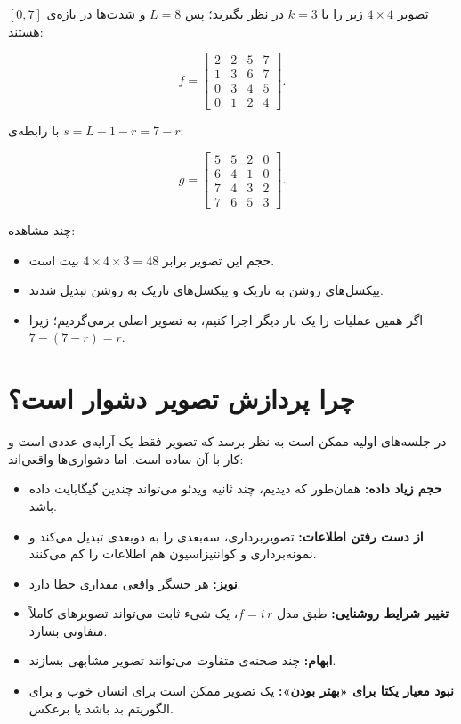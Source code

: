 \documentclass[11pt,a4paper]{article}
\begin{document}
	تصویر $4\times4$ زیر را با $k=3$ در نظر بگیرید؛ پس $L=8$ و شدت‌ها در بازه‌ی $[0,7]$ هستند:
	
	\[
	f=
	\begin{bmatrix}
		2 & 2 & 5 & 7\\
		1 & 3 & 6 & 7\\
		0 & 3 & 4 & 5\\
		0 & 1 & 2 & 4
	\end{bmatrix}.
	\]
	
	با رابطه‌ی $s=L-1-r=7-r$:
	
	\[
	g=
	\begin{bmatrix}
		5 & 5 & 2 & 0\\
		6 & 4 & 1 & 0\\
		7 & 4 & 3 & 2\\
		7 & 6 & 5 & 3
	\end{bmatrix}.
	\]
	
	چند مشاهده:
	
	\begin{itemize}
		\item حجم این تصویر برابر $4\times4\times3=48$ بیت است.
		\item پیکسل‌های روشن به تاریک و پیکسل‌های تاریک به روشن تبدیل شدند.
		\item اگر همین عملیات را یک بار دیگر اجرا کنیم، به تصویر اصلی برمی‌گردیم؛ زیرا
		$7-(7-r)=r$.
	\end{itemize}
	
	
	\section{چرا پردازش تصویر دشوار است؟}
	
	در جلسه‌های اولیه ممکن است به نظر برسد که تصویر فقط یک آرایه‌ی عددی است و کار با آن ساده است.
	اما دشواری‌ها واقعی‌اند:
	
	\begin{itemize}
		\item \textbf{حجم زیاد داده:} همان‌طور که دیدیم، چند ثانیه ویدئو می‌تواند چندین گیگابایت داده باشد.
		\item \textbf{از دست رفتن اطلاعات:} تصویربرداری، سه‌بعدی را به دوبعدی تبدیل می‌کند
		و نمونه‌برداری و کوانتیزاسیون هم اطلاعات را کم می‌کنند.
		\item \textbf{نویز:} هر حسگر واقعی مقداری خطا دارد.
		\item \textbf{تغییر شرایط روشنایی:} طبق مدل $f=i\,r$، یک شیء ثابت می‌تواند تصویرهای کاملاً متفاوتی بسازد.
		\item \textbf{ابهام:} چند صحنه‌ی متفاوت می‌توانند تصویر مشابهی بسازند.
		\item \textbf{نبود معیار یکتا برای «بهتر بودن»:} یک تصویر ممکن است برای انسان خوب و برای الگوریتم بد باشد یا برعکس.
	\end{itemize}
	
\end{document}
